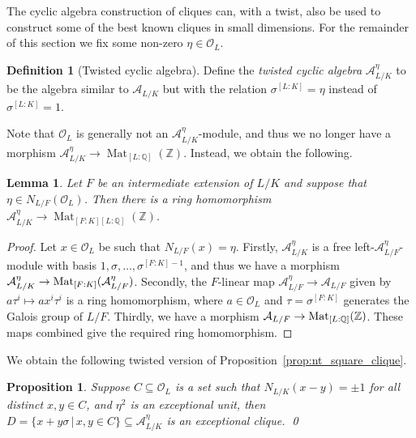 \documentclass{amsart}
\theoremstyle{plain}
\newtheorem{lemma}[theorem]{Lemma}
\newtheorem{proposition}[theorem]{Proposition}
\theoremstyle{definition}
\newtheorem{definition}[theorem]{Definition}
\DeclareMathOperator{\Mat}{Mat}
\newcommand{\ent}{\mathcal{O}}
\newcommand{\A}{\mathcal{A}}
\newcommand{\Z}{\ensuremath{\mathbb{Z}}}
\newcommand{\Q}{\ensuremath{\mathbb{Q}}}
\newcommand{\clq}{C}
\newcommand{\clqb}{D}
\begin{document}
The cyclic algebra construction of cliques can, with a twist, also be used to construct some of the best known cliques in small dimensions. For the remainder of this section we fix some non-zero \(\eta\in\ent_L\).

\begin{definition}[Twisted cyclic algebra]
	Define the \emph{twisted cyclic algebra} $\A_{L/K}^\eta$ to be the algebra similar to $\A_{L/K}$ but with the relation $\sigma^{[L:K]}=\eta$ instead of $\sigma^{[L:K]}=1$.
\end{definition}

Note that \(\ent_L\) is generally not an \(\A_{L/K}^\eta\)-module, and thus we no longer have a morphism \(\mathcal{A}_{L/K}^\eta\to\Mat_{[L:\Q]}(\Z)\).
Instead, we obtain the following.

\begin{lemma}\label{lem:mat_embedding_twist}
	Let $F$ be an intermediate extension of $L/K$ and suppose that $\eta\in N_{L/F}(\ent_L)$. 
	Then there is a ring homomorphism $\A_{L/K}^\eta\to \Mat_{[F:K][L:\Q]}(\Z)$.
\end{lemma}

\begin{proof}
	Let \(x\in\mathcal{O}_L\) be such that \(N_{L/F}(x)=\eta\).
	Firstly, \(\mathcal{A}_{L/K}^\eta\) is a free left-\(\mathcal{A}_{L/F}^\eta\)-module with basis \(1,\sigma,\dotsc,\sigma^{[F:K]-1}\), and thus we have a morphism \(\mathcal{A}_{L/K}^\eta\to\textup{Mat}_{[F:K]}(\mathcal{A}_{L/F}^\eta)\).
	Secondly, the \(F\)-linear map \(\mathcal{A}_{L/F}^\eta\to \mathcal{A}_{L/F}\) given by \(a\tau^i \mapsto ax^i\tau^i\) is a ring homomorphism, where \(a\in \mathcal{O}_L\) and \(\tau=\sigma^{[F:K]}\) generates the Galois group of \(L/F\). 
	Thirdly, we have a morphism \(\mathcal{A}_{L/F}\to\textup{Mat}_{[L:\Q]}(\Z)\).
	These maps combined give the required ring homomorphism.
\end{proof}

We obtain the following twisted version of Proposition~\ref{prop:nt_square_clique}.


\begin{proposition}\label{prop:nt_square_clique_twisted}
	Suppose \(\clq\subseteq \mathcal{O}_L\) is a set such that \(N_{L/K}(x-y)=\pm1\) for all distinct \(x,y\in \clq\), and \(\eta^2\) is an exceptional unit, then \(\clqb=\{x+y\sigma\,|\, x,y\in \clq\}\subseteq\mathcal{A}_{L/K}^\eta\) is an exceptional clique. \qed
\end{proposition}
\end{document}
